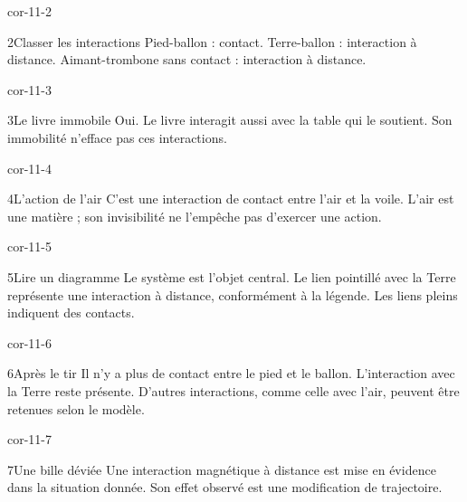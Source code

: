 \documentclass[12pt,twoside,openany]{book}
\begin{document}
\begin{blocLivre}{cor-11-2}
\begin{corrige}{2}{Classer les interactions}
Pied-ballon : contact. Terre-ballon : interaction à distance. Aimant-trombone sans contact : interaction à distance.\par
\end{corrige}\end{blocLivre}
\begin{blocLivre}{cor-11-3}
\begin{corrige}{3}{Le livre immobile}
Oui. Le livre interagit aussi avec la table qui le soutient. Son immobilité n’efface pas ces interactions.\par
{}
\end{corrige}\end{blocLivre}
\begin{blocLivre}{cor-11-4}
\begin{corrige}{4}{L’action de l’air}
C’est une interaction de contact entre l’air et la voile. L’air est une matière ; son invisibilité ne l’empêche pas d’exercer une action.\par
\end{corrige}\end{blocLivre}
\begin{blocLivre}{cor-11-5}
\begin{corrige}{5}{Lire un diagramme}
Le système est l’objet central. Le lien pointillé avec la Terre représente une interaction à distance, conformément à la légende. Les liens pleins indiquent des contacts.\par
{}
\end{corrige}\end{blocLivre}
\begin{blocLivre}{cor-11-6}
\begin{corrige}{6}{Après le tir}
Il n’y a plus de contact entre le pied et le ballon. L’interaction avec la Terre reste présente. D’autres interactions, comme celle avec l’air, peuvent être retenues selon le modèle.\par
\end{corrige}\end{blocLivre}
\begin{blocLivre}{cor-11-7}
\begin{corrige}{7}{Une bille déviée}
Une interaction magnétique à distance est mise en évidence dans la situation donnée. Son effet observé est une modification de trajectoire.\par
\end{corrige}\end{blocLivre}
\end{document}
